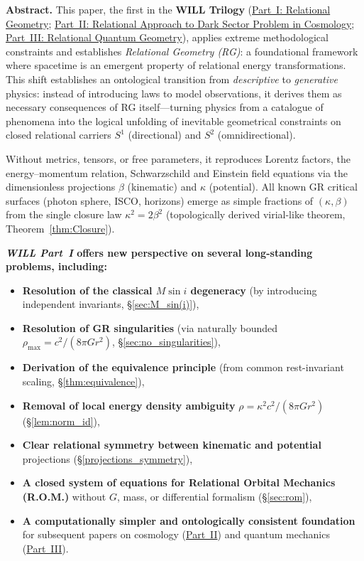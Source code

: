 \documentclass[10pt, a4paper]{article}
\begin{document}
\begin{center}
\begin{minipage}{0.95\textwidth}
\small
\textbf{Abstract.}
This paper, the first in the \textbf{WILL Trilogy}
\hypertarget{trilogy}{}\label{trilogy}
(\href{https://willrg.com/documents/WILL_RG_I.pdf}{Part~I: Relational Geometry};
\href{https://willrg.com/documents/WILL_RG_II.pdf}{Part~II: Relational Approach to Dark Sector Problem in Cosmology};
\href{https://willrg.com/documents/WILL_RG_III.pdf}{Part~III: Relational Quantum Geometry}),
applies extreme methodological constraints and establishes \textit{Relational Geometry (RG)}: a foundational framework where spacetime is an emergent property of relational energy transformations. This shift establishes an ontological transition from \textit{descriptive} to \textit{generative} physics: instead of introducing laws to model observations, it derives them as necessary consequences of RG itself---turning physics from a catalogue of phenomena into the logical unfolding of inevitable geometrical constraints on closed relational carriers $S^1$ (directional) and $S^2$ (omnidirectional).

Without metrics, tensors, or free parameters, it reproduces Lorentz factors, the energy--momentum relation, Schwarzschild and Einstein field equations via the dimensionless projections $\beta$ (kinematic) and $\kappa$ (potential). All known GR critical surfaces (photon sphere, ISCO, horizons) emerge as simple fractions of $(\kappa,\beta)$ from the single closure law $\kappa^2=2\beta^2$ (topologically derived virial-like theorem, Theorem~\ref{thm:Closure}).

\textbf{\textit{WILL Part~I} offers new perspective on several long-standing problems, including:}
\begin{itemize}[nosep,leftmargin=*]
    \item \textbf{Resolution of the classical $M\sin i$ degeneracy} (by introducing independent invariants, \S\ref{sec:M_sin(i)}),
    \item \textbf{Resolution of GR singularities} (via naturally bounded $\rho_{\max}=c^{2}/(8\pi G r^{2})$, \S\ref{sec:no_singularities}),
    \item \textbf{Derivation of the equivalence principle} (from common rest-invariant scaling, \S\ref{thm:equivalence}),
    \item \textbf{Removal of local energy density ambiguity} $\rho=\kappa^{2}c^{2}/(8\pi G r^{2})$ (\S\ref{lem:norm_id}),
    \item \textbf{Clear relational symmetry between kinematic and potential} projections (\S\ref{projections_symmetry}),
    \item \textbf{A closed system of equations for Relational Orbital Mechanics (R.O.M.)} without $G$, mass, or differential formalism (\S\ref{sec:rom}),
    \item \textbf{A computationally simpler and ontologically consistent foundation} for subsequent papers on cosmology (\href{https://willrg.com/documents/WILL_RG_II.pdf}{Part~II}) and quantum mechanics (\href{https://willrg.com/documents/WILL_RG_III.pdf}{Part~III}).
\end{itemize}
\end{minipage}
\end{center}
\end{document}
